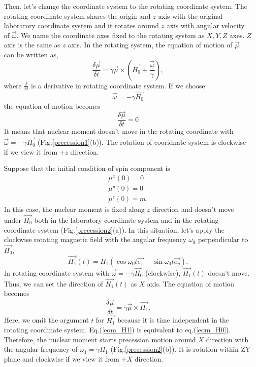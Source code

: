Then, let's change the coordinate system to the rotating coordinate system.
The rotating coordinate system shares the origin and $z$ axis with the original laborarory coordinate system and it rotates
around $z$ axis with angular velocity of $\vec{\omega}$.
We name the coordinate axes fixed to the rotating system as $X, Y, Z$ axes.
$Z$ axis is the same as $z$ axis.
In the rotating system, the equation of motion of $\vec{\mu}$ can be written as,
\begin{equation}
\frac{\delta\vec{\mu}}{\delta t} = \gamma\vec{\mu}\times\left(\overrightarrow{H_0} + \frac{\vec{\omega}}{\gamma}\right),
\end{equation}
where $\frac{\delta}{\delta t}$ is a derivative in rotating coordinate system.
If we choose
\begin{equation}
\vec{\omega} = -\gamma\overrightarrow{H_0}
\end{equation}
the equation of motion becomes
\begin{equation}
\frac{\delta\vec{\mu}}{\delta t} = 0
\end{equation}
It means that nuclear moment doesn't move in the rotating coordinate with $\vec{\omega} = -\gamma\overrightarrow{H_0}$ (Fig.\ref{precession1}(b)).
The rotation of cooridnate system is clockwise if we view it from $+z$ direction.

Suppose that the initial condition of spin component is
\begin{align}
\mu^x(0) = 0\\
\mu^y(0) = 0\\
\mu^z(0) = m.
\end{align}
In this case, the nuclear moment is fixed along $z$ direction and doesn't move under $\overrightarrow{H_0}$
both in the laboratory coordinate system and in the rotating coordinate system (Fig.\ref{precession2}(a)).
In this situation, let's apply the clockwise rotating magnetic field with the angular frequency $\omega_0$ perpendicular to $\overrightarrow{H_0}$,
\begin{equation}
\overrightarrow{H_1}(t) = H_1(\cos\omega_0t\vec{e_x} - \sin\omega_0t\vec{e_y}).
\end{equation}
In rotating coordinate system with $\vec{\omega} = -\gamma\overrightarrow{H_0}$ (clockwise), $\overrightarrow{H_1}(t)$ doesn't move.
Thus, we can set the direction of $\overrightarrow{H_1}(t)$ as $X$ axis.
The equation of motion becomes
\begin{equation}
\frac{\delta\vec{\mu}}{\delta t} = \gamma\vec{\mu}\times\overrightarrow{H_1}.
\label{eom_H1}
\end{equation}
Here, we omit the argument $t$ for $\overrightarrow{H_1}$ because it is time independent in the rotating coordinate system.
Eq.(\ref{eom_H1}) is equivalent to eq.(\ref{eom_H0}).
Therefore, the nuclear moment starts precession motion around $X$ direction with the angular frequency of $\omega_1 = \gamma H_1$ (Fig.\ref{precession2}(b)).
It is rotation within ZY plane and clockwise if we view it from $+X$ direction.

